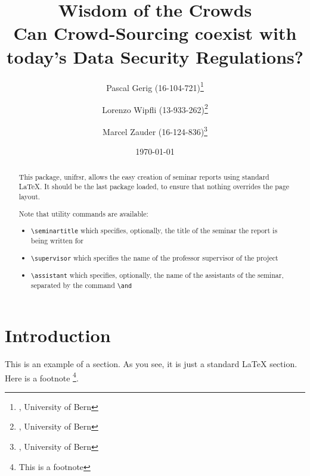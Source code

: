 \documentclass[a4paper,12pt]{report}
\begin{document}

	\title{Wisdom of the Crowds \\ Can Crowd-Sourcing coexist with today’s Data Security Regulations?} %

	\author{Pascal Gerig (16-104-721)\thanks{, University of Bern}
   		\and Lorenzo Wipfli  (13-933-262)\thanks{, University of Bern}
   		\and Marcel Zauder  (16-124-836)\thanks{, University of Bern}
   	}	%



	\date{\today} %

	\maketitle

	\begin{abstract}
		This package, \textsf{unifrsr}, allows the easy creation of seminar
		reports using standard \LaTeX. It should be the last
		package loaded, to ensure that nothing overrides the page layout.

		Note that utility commands are available: 
		\begin{itemize}
			\item \verb+\seminartitle+ which specifies, optionally, the title of the seminar the report is being written for
			\item \verb+\supervisor+ which specifies the name of the professor supervisor of the project
			\item \verb+\assistant+ which specifies, optionally, the name of the assistants of the seminar, separated by the command \verb+\and+
		\end{itemize}

	\end{abstract}

	\tableofcontents

	\chapter{Introduction}
		This is an example of a section. As you see, it is just a standard {\LaTeX} section. Here is a footnote%
		\footnote{This is a footnote}.
\end{document}
